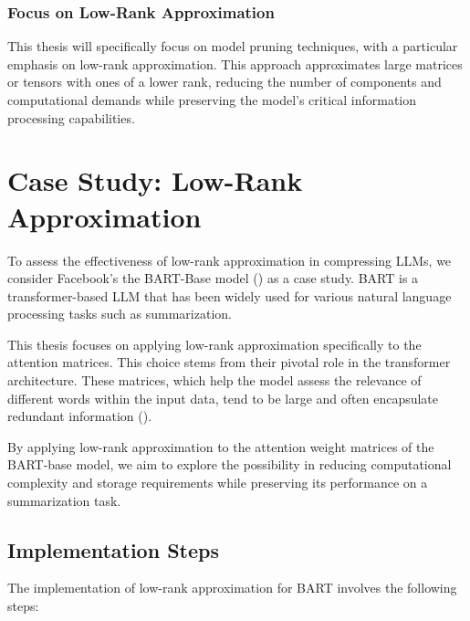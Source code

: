         \subsubsection{Focus on Low-Rank Approximation}
        This thesis will specifically focus on model pruning techniques, with a particular emphasis on low-rank approximation. This approach approximates large matrices or tensors with ones of a lower rank, reducing the number of components and computational demands while preserving the model's critical information processing capabilities.


\section{Case Study: Low-Rank Approximation}
    To assess the effectiveness of low-rank approximation in compressing LLMs, we consider Facebook's the BART-Base model (\cite{lewis2019bart}) as a case study. BART is a transformer-based LLM that has been widely used for various natural language processing tasks such as summarization.%

    This thesis focuses on applying low-rank approximation specifically to the attention matrices. This choice stems from their pivotal role in the transformer architecture. These matrices, which help the model assess the relevance of different words within the input data, tend to be large and often encapsulate redundant information (\cite{aghajanyan2020intrinsic}). %

    By applying low-rank approximation to the attention weight matrices of the BART-base model, we aim to explore the possibility in reducing computational complexity and storage requirements while preserving its performance on a summarization task.
    \subsection{Implementation Steps}
        The implementation of low-rank approximation for BART involves the following steps:
        
